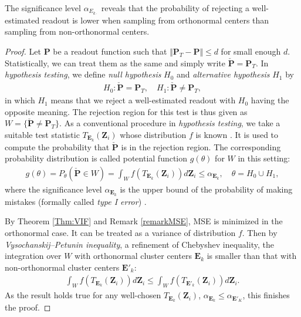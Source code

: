 \begin{theorem}\label{Thm:MSE}
	The significance level $\alpha_{E_{k\cdot}}$ reveals that the probability of rejecting a well-estimated readout is lower when sampling from orthonormal centers than sampling from non-orthonormal centers.
\end{theorem}
\begin{proof}
	Let $\bm P$ be a readout function such that $\Vert \bm P_T- \bm P \Vert \le d$ for small enough $d$. Statistically, we can treat them as the same and simply write $\check{\bm P} = \bm P_T$. In \emph{hypothesis testing}, we define \emph{null hypothesis} $H_0$ and \emph{alternative hypothesis} $H_1$ by
	\begin{align}
		H_0: \check{\bm P} = \bm P_T, \quad H_1: \check{\bm P} \neq \bm P_T,
	\end{align}
    in which $H_1$ means that we reject a well-estimated readout with $H_0$ having the opposite meaning. The rejection region for this test is thus given as $W = \{ \check{\bm P} \neq \bm P_T\}$. As a conventional procedure in \emph{hypothesis testing}, we take a suitable test statistic $T_{\bm E_k}(\bm Z_i)$ whose distribution $f$ is known \cite{DeGroot2012}. It is used to compute the probability that $\check{\bm P}$ is in the rejection region. The corresponding probability distribution is called potential function $g(\theta)$ for $W$ in this setting:
	\begin{align}
		g(\theta) = P_{\theta}(\check{\bm P} \in W) = \int_W f(T_{\bm E_k}(\bm Z_i)) d\bm Z_i \leq \alpha_{\bm E_k},\quad \theta = H_0 \cup H_1,
	\end{align}
	where the significance level $\alpha_{\bm E_k}$ is the upper bound of the probability of making mistakes (formally called \emph{type I error}) \cite{DeGroot2012}.
	
    By Theorem \ref{Thm:VIF} and Remark \ref{remarkMSE}, MSE is minimized in the orthonormal case. It can be treated as a variance of distribution $f$. Then by \emph{Vysochanskij–Petunin inequality}, a refinement of Chebyshev inequality, the integration over $W$ with orthonormal cluster centers $\bm E_k$ is smaller than that with non-orthonormal cluster centers $\bm E'_k$:
	\begin{align}
		\int_W f(T_{\bm E_k}(\bm Z_i)) d\bm Z_i \leq \int_W f(T_{\bm E'_k}(\bm Z_i)) d\bm Z_i. 
	\end{align}
    As the result holds true for any well-chosen $T_{\bm E_k}(\bm Z_i)$, $\alpha_{\bm E_k} \leq \alpha_{\bm E'_K}$, this finishes the proof.
\end{proof}


